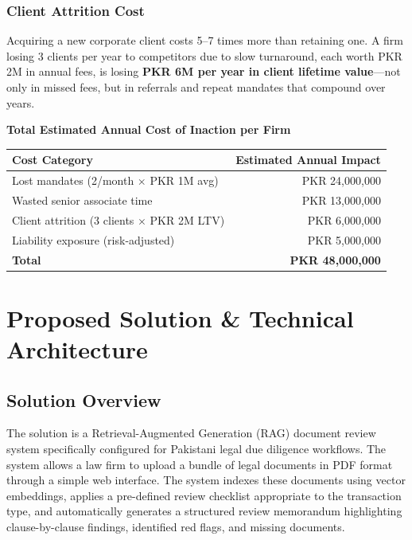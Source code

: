 \documentclass[12pt, a4paper]{article}
\begin{document}
\subsubsection{Client Attrition Cost}

Acquiring a new corporate client costs 5--7 times more than retaining one.
A firm losing 3 clients per year to competitors due to slow turnaround, each worth
PKR 2M in annual fees, is losing \textbf{PKR 6M per year in client lifetime
value}---not only in missed fees, but in referrals and repeat mandates that
compound over years.

\begin{metricbox}
\centering
\vspace{0.2cm}
{\bfseries Total Estimated Annual Cost of Inaction per Firm}\\[0.4cm]
\begin{tabular}{@{}lr@{}}
    \toprule
    \textbf{Cost Category} & \textbf{Estimated Annual Impact} \\
    \midrule
    Lost mandates (2/month $\times$ PKR 1M avg)    & PKR 24,000,000 \\
    Wasted senior associate time                    & PKR 13,000,000 \\
    Client attrition (3 clients $\times$ PKR 2M LTV) & PKR 6,000,000 \\
    Liability exposure (risk-adjusted)             & PKR 5,000,000  \\
    \midrule
    \textbf{Total}                                  & \textbf{PKR 48,000,000} \\
    \bottomrule
\end{tabular}
\vspace{0.1cm}
\end{metricbox}

\section{Proposed Solution \& Technical Architecture}

\subsection{Solution Overview}

The solution is a Retrieval-Augmented Generation (RAG) document review system
specifically configured for Pakistani legal due diligence workflows. The system
allows a law firm to upload a bundle of legal documents in PDF format through a
simple web interface. The system indexes these documents using vector embeddings,
applies a pre-defined review checklist appropriate to the transaction type, and
automatically generates a structured review memorandum highlighting clause-by-clause
findings, identified red flags, and missing documents.
\end{document}

